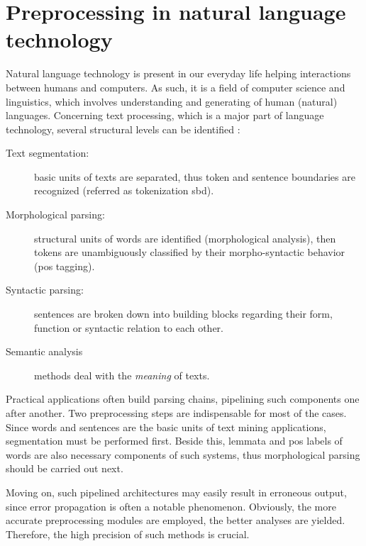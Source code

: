 \section{Preprocessing in natural language technology}



Natural language technology is present in our everyday life helping interactions between humans and computers.
As such, it is a field of computer science and linguistics, which involves understanding and generating of human (natural) languages.
Concerning text processing, which is a major part of language technology, several structural levels can be identified \cite{manning1999foundations}:
\begin{description}
\item[Text segmentation:] basic units of texts are separated, thus token  and sentence boundaries are recognized (referred as tokenization \gls{sbd}).
\item[Morphological parsing:] structural units of words are identified (morphological analysis), then tokens are unambiguously classified by their morpho-syntactic behavior (\acrlong{pos} tagging).
\item[Syntactic parsing:] sentences are broken down into building blocks regarding their form, function or syntactic relation to each other.
\item[Semantic analysis] methods deal with the \emph{meaning} of texts.
\end{description}

Practical applications often build parsing chains, pipelining such components one after another. 
Two preprocessing steps are indispensable for most of the cases.
Since words and sentences are the basic units of text mining applications, segmentation must be performed first.
Beside this, lemmata and \gls{pos} labels of words are also necessary components of such systems, thus morphological parsing should be carried out next.

Moving on, such pipelined architectures may easily result in erroneous output, since error propagation is often a notable phenomenon. 
Obviously, the more accurate preprocessing modules are employed, the better analyses are yielded. Therefore, the high precision of such methods is crucial.

